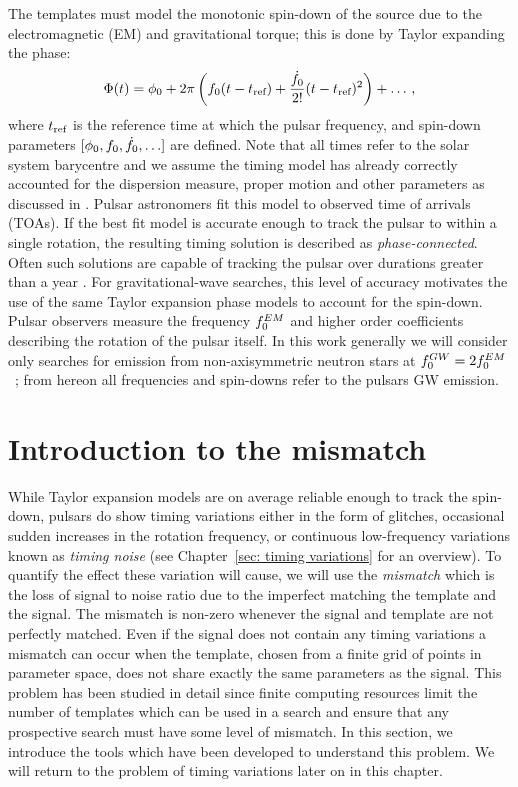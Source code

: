 \documentclass[../full_thesis/full_thesis.tex]{subfiles}
\begin{document}
The templates must model the monotonic spin-down of the source due to the
electromagnetic (EM) and gravitational torque; this is done by Taylor expanding
the phase:
\begin{equation}
\Phi(t) = \phi_{0} + 2\pi\left(f_{0} (t - t_{\textrm{ref}}) +
          \frac{\dot{f}_{0}}{2!} (t - t_{\textrm{ref}})^{2}
           \right)
           + \ldots
           \,,
\label{eqn: Taylor}
\end{equation}
where $t_{\textrm{ref}}$ is the reference time at which the pulsar frequency, and
spin-down parameters $[\phi_{0}, f_{0}, \dot{f}_{0}, \ldots]$ are defined. Note
that all times refer to the solar system barycentre and we assume the
timing model has already correctly accounted for the dispersion measure, proper motion
and other parameters as discussed in \citet{Edwards2006}.
Pulsar astronomers fit this model to observed time of arrivals (TOAs). If the
best fit model is accurate enough to track the pulsar to within a single
rotation, the resulting timing solution is described as \emph{phase-connected}.
Often such solutions are capable of tracking the pulsar over durations greater
than  a year \citep{Lyne2012book}.  For gravitational-wave searches, this level of accuracy
motivates the use of the same Taylor expansion phase models to account for the
spin-down.  Pulsar observers measure the frequency $f_{0}^{EM}$ and higher
order coefficients describing the rotation of the pulsar itself. In this
work generally we will consider only searches for
emission from non-axisymmetric neutron stars at
$f_{0}^{GW}=2f_{0}^{EM}$~\citep{Shapiro83}; from hereon all frequencies
and spin-downs refer to the pulsars GW emission.


\section{Introduction to the mismatch}
\label{sec: introduction to the mismatch}
While Taylor expansion models are on average reliable enough to track the
spin-down, pulsars do show timing variations either in the form of glitches,
occasional sudden increases in the rotation frequency, or continuous
low-frequency variations known as \emph{timing noise} (see Chapter~\ref{sec:
timing variations} for an overview). To quantify the effect these variation
will cause, we will use the \emph{mismatch} which is the loss of signal to
noise ratio due to the imperfect matching the template and the signal. The
mismatch is non-zero whenever the signal and template are not perfectly
matched. Even if the signal does not contain any timing variations a mismatch
can occur when the template, chosen from a finite grid of points in parameter
space, does not share exactly the same parameters as the signal. This problem
has been studied in detail since finite computing resources limit the number of
templates which can be used in a search and ensure that any prospective search
must have some level of mismatch. In this section, we introduce the tools
which have been developed to understand this problem. We will return to the
problem of timing variations later on in this chapter.
\end{document}
